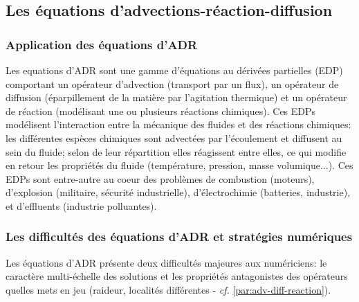 \subsection{Les équations d'advections-réaction-diffusion}
    \subsubsection{Application des équations d'ADR}
    Les equations d'ADR sont une gamme d'équations au dérivées partielles (EDP) comportant un opérateur d'advection (transport par un flux),
    un opérateur de diffusion (éparpillement de la matière par l'agitation thermique) et un opérateur de réaction (modélisant une ou plusieurs réactions chimiques).
    Ces EDPs modélisent l'interaction entre la mécanique des fluides et des réactions chimiques: les différentes espèces chimiques sont advectées par l'écoulement et diffusent au sein du fluide;
    selon de leur répartition elles réagissent entre elles, ce qui modifie en retour les propriétés du fluide (température, pression, masse volumique...). 
    Ces EDPs sont entre-autre au coeur des problèmes de combustion (moteurs), d'explosion (militaire, sécurité industrielle), d'électrochimie (batteries, industrie), 
    et d'effluents (industrie polluantes).
    \subsubsection{Les difficultés des équations d'ADR et stratégies numériques}
    Les équations d'ADR présente deux difficultés majeures aux numériciens: le caractère multi-échelle des solutions et les propriétés antagonistes des opérateurs quelles mets en jeu
    (raideur, localités différentes - \textit{cf.} \ref{par:adv-diff-reaction}).\par

